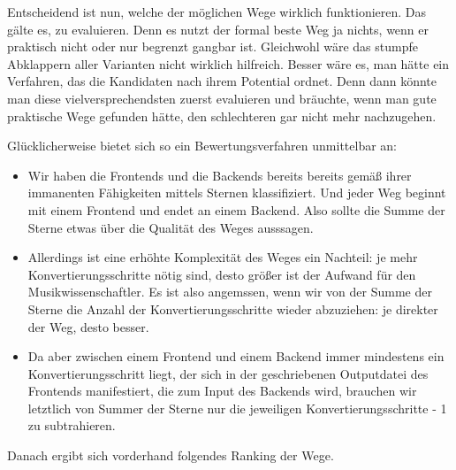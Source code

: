 Entscheidend ist nun, welche der möglichen Wege wirklich funktionieren. Das
gälte es, zu evaluieren. Denn es nutzt der formal beste Weg ja nichts, wenn er
praktisch nicht oder nur begrenzt gangbar ist. Gleichwohl wäre das stumpfe
Abklappern aller Varianten nicht wirklich hilfreich. Besser wäre es, man
hätte ein Verfahren, das die Kandidaten nach ihrem Potential ordnet. Denn dann
könnte man diese vielversprechendsten zuerst evaluieren und bräuchte, wenn man
gute praktische Wege gefunden hätte, den schlechteren gar nicht mehr
nachzugehen.

Glücklicherweise bietet sich so ein Bewertungsverfahren unmittelbar an:

\begin{itemize}
  \item Wir haben die Frontends und die Backends bereits bereits gemäß ihrer
  immanenten Fähigkeiten mittels Sternen klassifiziert. Und jeder Weg beginnt
  mit einem Frontend und endet an einem Backend. Also sollte die Summe der
  Sterne etwas über die Qualität des Weges ausssagen.
  \item Allerdings ist eine erhöhte Komplexität des Weges ein Nachteil: je mehr
  Konvertierungsschritte nötig sind, desto größer ist der Aufwand für den
  Musikwissenschaftler. Es ist also angemssen, wenn wir von der Summe der Sterne
  die Anzahl der Konvertierungsschritte wieder abzuziehen: je direkter der Weg,
  desto besser.
  \item Da aber zwischen einem Frontend und einem Backend immer mindestens ein
  Konvertierungsschritt liegt, der sich in der geschriebenen Outputdatei des
  Frontends manifestiert, die zum Input des Backends wird, brauchen wir
  letztlich von Summer der Sterne nur die jeweiligen Konvertierungsschritte - 1
  zu subtrahieren.
\end{itemize}

Danach ergibt sich vorderhand folgendes Ranking der Wege.

